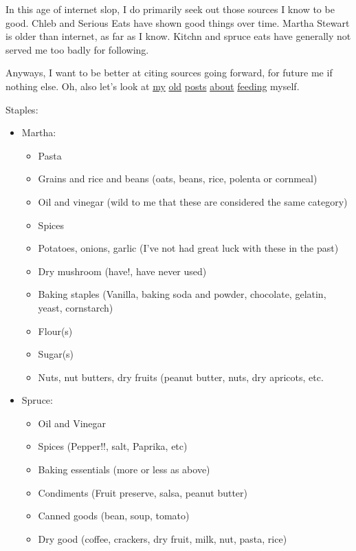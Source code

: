 \documentclass[12pt]{article}
\renewcommand{\,}{\textsuperscript{,}}
\begin{document}
\begin{itemize}
\begin{itemize}
In this age of internet slop, I do primarily seek out those sources I know to be good.  
Chleb and Serious Eats have shown good things over time.  
Martha Stewart is older than internet, as far as I know.  
Kitchn and spruce eats have generally not served me too badly for following.

Anyways, I want to be better at citing sources going forward, for future me if nothing else.  
Oh, also let's look at \href{dietary-needs}{my} \href{dietary-needs-2}{old} \href{dietary-needs-3}{posts} \href{dietary-needs-4}{about} \href{dietary-needs-5}{feeding} myself.

Staples:  
\begin{itemize}

\item Martha:

\begin{itemize} cans and tubes as a category, including tomato, tomato paste, fruit.  
\item Pasta  
\item Grains and rice and beans (oats, beans, rice, polenta or cornmeal)  
\item Oil and vinegar (wild to me that these are considered the same category)  
\item Spices  
\item Potatoes, onions, garlic (I've not had great luck with these in the past)  
\item Dry mushroom (have!, have never used)  
\item Baking staples (Vanilla, baking soda and powder, chocolate, gelatin, yeast, cornstarch)  
\item Flour(s)  
\item Sugar(s)  
\item Nuts, nut butters, dry fruits (peanut butter, nuts, dry apricots, etc.  
\end{itemize}  
\item Spruce:  
\begin{itemize}  
\item Oil and Vinegar  
\item Spices (Pepper!!, salt, Paprika, etc)  
\item Baking essentials (more or less as above)  
\item Condiments (Fruit preserve, salsa, peanut butter)  
\item Canned goods (bean, soup, tomato)  
\item Dry good (coffee, crackers, dry fruit, milk, nut, pasta, rice)  
\end{itemize}  

\end{itemize}
\end{itemize}
\end{itemize}
\end{document}

